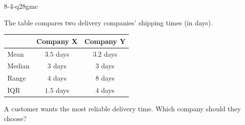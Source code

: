 \begin{practiceQuestion}{8-4-q28}{gmc}
\begin{questionText}
The table compares two delivery companies' shipping times (in days).

\begin{center}
\begin{tabular}{|l|c|c|}
\hline
 & \textbf{Company X} & \textbf{Company Y} \\
\hline
Mean & $3.5$ days & $3.2$ days \\
\hline
Median & $3$ days & $3$ days \\
\hline
Range & $4$ days & $8$ days \\
\hline
IQR & $1.5$ days & $4$ days \\
\hline
\end{tabular}
\end{center}

A customer wants the most reliable delivery time. Which company should they choose?
\end{questionText}
\end{practiceQuestion}

